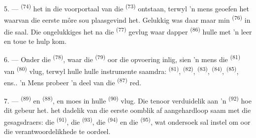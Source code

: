 5. ---  \textsuperscript{(74)} het in die voorportaal van die
 \textsuperscript{(73)} ontstaan, terwyl 'n mens 
geoefen het waarvan die eerste  môre sou plaasgevind het. Gelukkig was
daar maar min  \textsuperscript{(76)} in die saal. Die ongelukkiges
het na die  \textsuperscript{(77)} gevlug waar dapper
 \textsuperscript{(86)} hulle met 'n leer en toue te hulp kom.

6. --- Onder die  \textsuperscript{(78)}, waar die 
\textsuperscript{(79)} oor die opvoering inlig, sien 'n mens die 
\textsuperscript{(81)} van  \textsuperscript{(80)} vlug, terwyl hulle
hulle instrumente saamdra:  \textsuperscript{(81)}, 
\textsuperscript{(82)},  \textsuperscript{(83)}, 
\textsuperscript{(84)},  \textsuperscript{(85)}, ens.. 'n Mens probeer 'n
deel van die  \textsuperscript{(87)} red.

7. ---  \textsuperscript{(89)} en 
\textsuperscript{(88)},  en  moes in hulle 
\textsuperscript{(90)} vlug. Die tenoor verduidelik aan 'n 
\textsuperscript{(92)} hoe dit gebeur het.  het dadelik van die
eerste oomblik af aangehardloop saam met die gesagsdraers: die 
\textsuperscript{(91)}, die  \textsuperscript{(93)}, die
 \textsuperscript{(94)} en die 
\textsuperscript{(95)}, wat ondersoek sal instel om oor die verantwoordelikhede te
oordeel.
\VUsaut{6.0mm}
\VUfilet{22mm}
